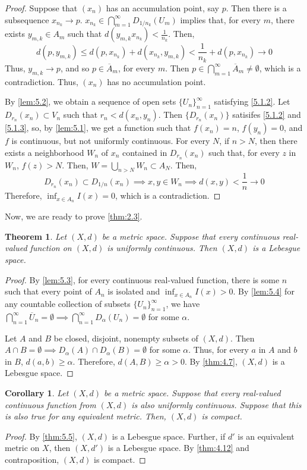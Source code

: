 \documentclass[openany, amssymb, psamsfonts]{amsart}
\let\fullref\autoref
\newtheorem{thm}{Theorem}[section]
\newtheorem{cor}{Corollary}[section]
\theoremstyle{definition}
\numberwithin{equation}{section}
\begin{document}
\begin{proof}
  Suppose that $(x_n)$ has an accumulation point, say $p$. Then there is a subsequence $x_{n_k}\to p$. $x_{n_k} \in \bigcap_{m=1}^\infty D_{1/n_k}(U_m)$ implies that, for every $m$, there exists $y_{m,k} \in A_m$ such that $d(y_{m,k} x_{n_k}) < \frac1{n_k}$. Then,
  \[
    d(p, y_{m,k}) \le d(p, x_{n_k}) + d(x_{n_k}, y_{m,k}) < \frac1{n_k} + d(p, x_{n_k}) \to 0
  \]
  Thus, $y_{m,k}\to p$, and so $p \in \overline{A}_m$, for every $m$. Then $p \in \bigcap_{m=1}^\infty \overline{A}_m \neq \emptyset$, which is a contradiction. Thus, $(x_n)$ has no accumulation point. 

  By \fullref{lem:5.2}, we obtain a sequence of open sets $\{U_n\}_{n=1}^\infty$ satisfying \ref{5.1.2}. Let $D_{r_n}(x_n)\subset V_n$ such that $r_n<d(x_n, y_n)$. Then $\{D_{r_n}(x_n)\}$ satisifes \ref{5.1.2} and \ref{5.1.3}, so, by \fullref{lem:5.1}, we get a function such that $f(x_n) = n$, $f(y_n) = 0$, and $f$ is continuous, but not uniformly continuous. For every $N$, if $n > N$, then there exists a neighborhood $W_n$ of $x_n$ contained in $D_{r_n}(x_n)$ such that, for every $z$ in $W_n$, $f(z) > N$. Then, $W = \bigcup_{n > N} W_n \subset A_N$. Then, 
  $$D_{r_n}(x_n) \subset D_{1/n}(x_n)\implies x,y \in W_n\implies d(x,y)< \frac1{n} \to 0$$ 
  Therefore, $\inf_{x \in A_n} I(x) = 0$, which is a contradiction.
\end{proof}

Now, we are ready to prove \fullref{thm:2.3}. 

\begin{thm} \label{thm:5.5}
  Let $(X,d)$ be a metric space. Suppose that every continuous real-valued function on $(X,d)$ is uniformly continuous. Then $(X,d)$ is a Lebesgue space.
\end{thm}
\begin{proof}
  By \fullref{lem:5.3}, for every continuous real-valued function, there is some $n$ such that every point of $A_n$ is isolated and $\inf_{x\in A_n} I(x) > 0$. By \fullref{lem:5.4} for any countable collection of subsets $\{U_n\}_{n=1}^\infty$, we have $\bigcap_{n=1}^\infty \overline{U}_n = \emptyset \implies \bigcap_{n=1}^\infty D_\alpha(U_n) = \emptyset$ for some $\alpha$. 

  Let $A$ and $B$ be closed, disjoint, nonempty subsets of $(X,d)$. Then $A \cap B = \emptyset \implies D_\alpha(A) \cap D_\alpha(B) = \emptyset$ for some $\alpha$. Thus, for every $a$ in $A$ and $b$ in $B$, $d(a,b) \ge \alpha$. Therefore, $d(A,B) \ge \alpha > 0$. By \fullref{thm:4.7}, $(X,d)$ is a Lebesgue space. 
\end{proof}
\begin{cor}
  Let $(X,d)$ be a metric space. Suppose that every real-valued continuous function from $(X,d)$ is also uniformly continuous. Suppose that this is also true for any equivalent metric. Then, $(X,d)$ is compact. 
\end{cor}
\begin{proof}
  By \fullref{thm:5.5}, $(X,d)$ is a Lebesgue space. Further, if $d'$ is an equivalent metric on $X$, then $(X,d')$ is a Lebesgue space. By \fullref{thm:4.12} and contraposition, $(X,d)$ is compact.  
\end{proof}
\end{document}
